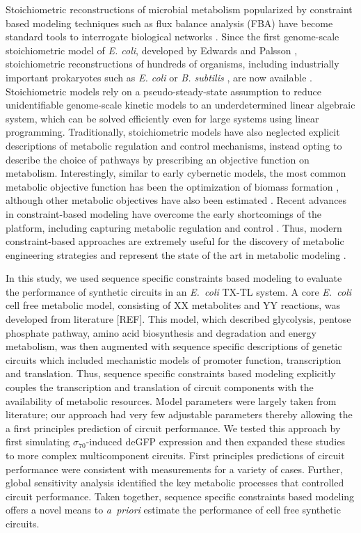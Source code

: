 \documentclass[journal=asbcd6,manuscript=article]{achemso}
\begin{document}
Stoichiometric reconstructions of microbial metabolism popularized by constraint based modeling techniques such as flux balance analysis (FBA) have become standard tools to interrogate biological networks \cite{2012_lewis_palsson_NatRevMicrobio}.
Since the first genome-scale stoichiometric model of \textit{E. coli}, developed by Edwards and Palsson \cite{2000_edwards_palsson_PNAS}, stoichiometric reconstructions of hundreds of organisms, including industrially important prokaryotes such as \textit{E. coli} \cite{Feist:2007aa} or \textit{B. subtilis} \cite{Oh:2007aa}, are now available \cite{2009_feist_palsson_NatRevMicrobio}.
Stoichiometric models rely on a pseudo-steady-state assumption to reduce unidentifiable genome-scale kinetic models to an underdetermined linear algebraic system, which can be solved efficiently even for large systems using linear programming.
Traditionally, stoichiometric models have also neglected explicit descriptions of metabolic regulation and control mechanisms, instead opting to describe the choice of pathways by prescribing an objective function on metabolism.
Interestingly, similar to early cybernetic models, the most common metabolic objective function has been the optimization of biomass formation \cite{2002_ibarra_edwards_palsson_Nat}, although other metabolic objectives have also been estimated \cite{2007_schuetz_sauer_MolSysBio}.
Recent advances in constraint-based modeling have overcome the early shortcomings of the platform, including capturing metabolic regulation and control \cite{2013_hyduke_lewis_palsson_MolBioSys}. Thus, modern constraint-based approaches are extremely useful for the discovery of metabolic engineering strategies and represent the state of the art in metabolic modeling \cite{2013_mccloskey_palsson_feist_MolSysBio, 2012_zomorrodi_maranas_MetaEng}.

In this study, we used sequence specific constraints based modeling to evaluate the performance of synthetic circuits in an \emph{E.~coli} TX-TL system.
A core \emph{E.~coli} cell free metabolic model, consisting of XX metabolites and YY reactions, was developed from literature [REF].
This model, which described glycolysis, pentose phosphate pathway, amino acid biosynthesis and degradation and energy metabolism, was then augmented with
sequence specific descriptions of genetic circuits which included mechanistic models of promoter function, transcription and translation.
Thus, sequence specific constraints based modeling explicitly couples
the transcription and translation of circuit components with the availability of metabolic resources.
Model parameters were largely taken from literature; our approach had very few adjustable parameters thereby allowing the a first principles prediction of circuit performance.
We tested this approach by first simulating $\sigma_{70}$-induced deGFP expression and then expanded these studies to more complex multicomponent circuits.
First principles predictions of circuit performance were consistent with measurements for a variety of cases.
Further, global sensitivity analysis identified the key metabolic processes that controlled circuit performance.
Taken together, sequence specific constraints based modeling offers a novel means to \emph{a~priori} estimate the performance of cell free synthetic circuits.
\end{document}
